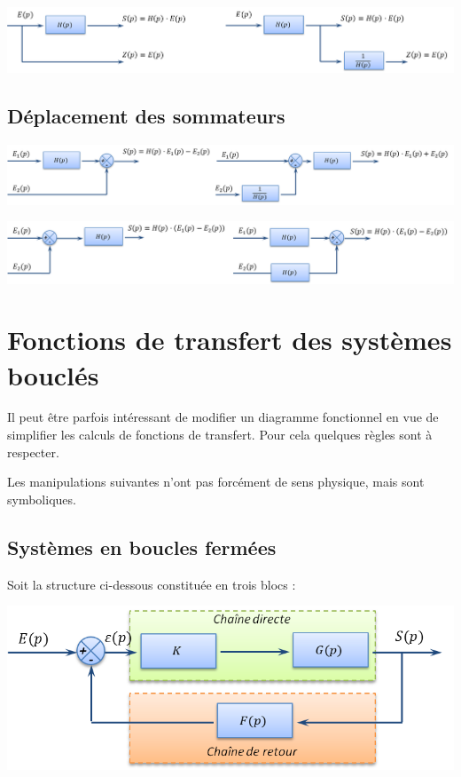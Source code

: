 \documentclass[11pt,oneside]{article}
\begin{document}
\begin{center}
 \includegraphics[width=\textwidth]{png/prelevement2}
\end{center}


\subsection{Déplacement des sommateurs}


\begin{center}
 \includegraphics[width=\textwidth]{png/sommateur1}
\end{center}

\begin{center}
 \includegraphics[width=\textwidth]{png/sommateur2}
\end{center}




\section{Fonctions de transfert des systèmes bouclés}
Il peut être parfois intéressant de modifier un diagramme fonctionnel en vue de simplifier les calculs de fonctions de transfert. Pour cela quelques règles sont à respecter.

Les manipulations suivantes n’ont pas forcément de sens physique, mais sont
symboliques.

\subsection{Systèmes en boucles fermées}
Soit la structure ci-dessous constituée en trois blocs :
\begin{center}
  \includegraphics[width=.7\textwidth]{png/CDCR}
\end{center}
\end{document}
